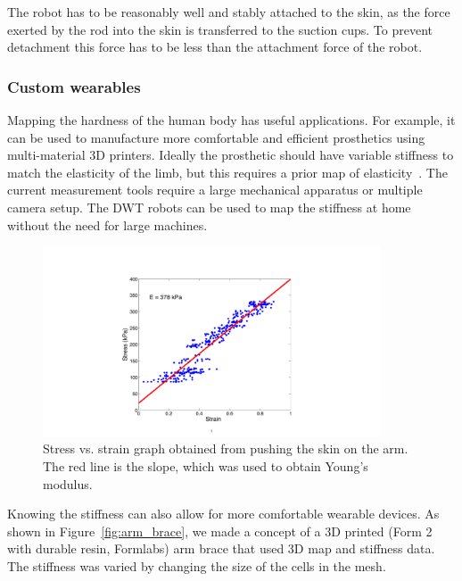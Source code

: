 The robot has to be reasonably well and stably attached to the skin, as the force exerted by the rod into the skin is transferred to the suction cups. To prevent detachment this force has to be less than the attachment force of the robot.

\subsubsection{Custom wearables}
Mapping the hardness of the human body has useful applications. For example, it can be used to manufacture more comfortable and efficient prosthetics using multi-material 3D printers. Ideally the prosthetic should have variable stiffness to match the elasticity of the limb, but this requires a prior map of elasticity~\cite{lin2017low,moerman2009digital}. The current measurement tools require a large mechanical apparatus or multiple camera setup.  The DWT robots can be used to map the stiffness at home without the need for large machines. 

\begin{figure}[!t]
\centering
\includegraphics[width=10.0cm]{pictures/applications/young_modulus_graph.pdf}
\caption{Stress vs. strain graph obtained from pushing the skin on the arm. The red line is the slope, which was used to obtain Young's modulus.}
\label{fig:youngs_modulus}
\end{figure}

Knowing the stiffness can also allow for more comfortable wearable devices. As shown in Figure~\ref{fig:arm_brace}, we made a concept of a 3D printed (Form 2 with durable resin, Formlabs) arm brace that used 3D map and stiffness data. The stiffness was varied by changing the size of the cells in the mesh.

